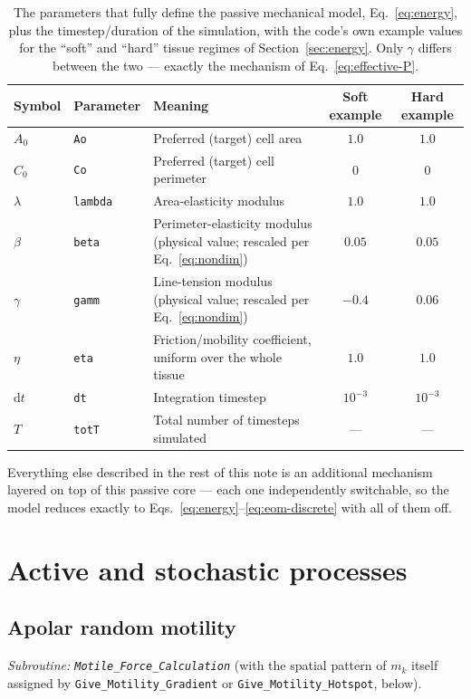 \documentclass[11pt]{article}
\newcommand{\ord}{\mathrm{d}}
\begin{document}
\begin{table}[h]
\centering
\begin{tabular}{@{}llp{5.4cm}cc@{}}
\toprule
Symbol & Parameter & Meaning & Soft example & Hard example \\
\midrule
$A_0$ & \texttt{Ao} & Preferred (target) cell area & $1.0$ & $1.0$ \\
$C_0$ & \texttt{Co} & Preferred (target) cell perimeter & $0$ & $0$ \\
$\lambda$ & \texttt{lambda} & Area-elasticity modulus & $1.0$ & $1.0$ \\
$\beta$ & \texttt{beta} & Perimeter-elasticity modulus (physical value; rescaled per Eq.~\eqref{eq:nondim}) & $0.05$ & $0.05$ \\
$\gamma$ & \texttt{gamm} & Line-tension modulus (physical value; rescaled per Eq.~\eqref{eq:nondim}) & $-0.4$ & $0.06$ \\
$\eta$ & \texttt{eta} & Friction/mobility coefficient, uniform over the whole tissue & $1.0$ & $1.0$ \\
$\ord t$ & \texttt{dt} & Integration timestep & $10^{-3}$ & $10^{-3}$ \\
$T$ & \texttt{totT} & Total number of timesteps simulated & --- & --- \\
\bottomrule
\end{tabular}
\caption{The parameters that fully define the passive mechanical model, Eq.~\eqref{eq:energy},
plus the timestep/duration of the simulation, with the code's own example values for
the ``soft'' and ``hard'' tissue regimes of Section~\ref{sec:energy}. Only $\gamma$
differs between the two --- exactly the mechanism of Eq.~\eqref{eq:effective-P}.}
\label{tab:passive}
\end{table}

Everything else described in the rest of this note is an additional mechanism layered
on top of this passive core --- each one independently switchable, so the model reduces
exactly to Eqs.~\eqref{eq:energy}--\eqref{eq:eom-discrete} with all of them off.

\section{Active and stochastic processes}
\label{sec:active}

\subsection{Apolar random motility}
\label{sec:motility}
\textit{Subroutine: \texttt{Motile\_\allowbreak Force\_\allowbreak Calculation}} (with the spatial pattern of
$m_k$ itself assigned by \texttt{Give\_\allowbreak Motility\_\allowbreak Gradient} or
\texttt{Give\_\allowbreak Motility\_\allowbreak Hotspot}, below).
\end{document}
